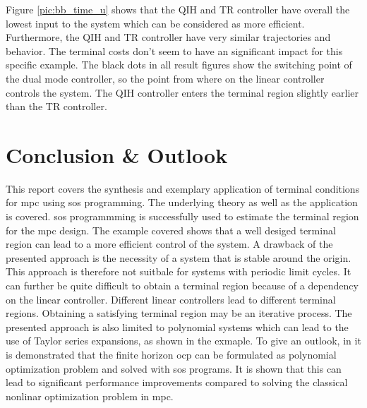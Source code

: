 \documentclass[10pt,a4paper]{article}
\begin{document}
Figure \ref{pic:bb_time_u} shows that the QIH and TR controller have overall the lowest input to the system which can be considered as more efficient. 
Furthermore, the QIH and TR controller have very similar
trajectories and behavior. The terminal costs don't seem to have an significant impact for this specific example. The black dots in all result figures show the
switching point of the dual mode controller, so the point from where on the linear controller controls the system. The QIH controller enters the terminal region
slightly earlier than the TR controller. 









\section{Conclusion \& Outlook}
\label{sec:conclusion}

This report covers the synthesis and exemplary application of terminal conditions for \gls{mpc} using \gls{sos} programming. The underlying theory as well as the 
application is covered. \gls{sos} programmming is successfully used to estimate the terminal region for the \gls{mpc} design. The example covered shows that a 
well desiged terminal region can lead to a more efficient control of the system. A drawback of the presented approach is the necessity of a system that is 
stable around the origin. This approach is therefore not suitbale for systems with periodic limit cycles.  It can further be quite difficult to obtain a 
terminal region because of a dependency on the linear controller. Different linear controllers lead to different terminal regions. Obtaining a satisfying terminal
region may be an iterative process. The presented approach is also limited to polynomial systems which can lead to the use of Taylor series expansions, as 
shown in the exmaple. To give an outlook, in \cite{RaffAllgoewer} it is demonstrated that the finite horizon \gls{ocp} can be formulated as polynomial optimization problem and solved with \gls{sos} programs.
It is shown that this can lead to significant performance improvements compared to solving the classical nonlinar optimization problem in \gls{mpc}. 




\pagebreak



\pagebreak
\listoftodos

\end{document}
